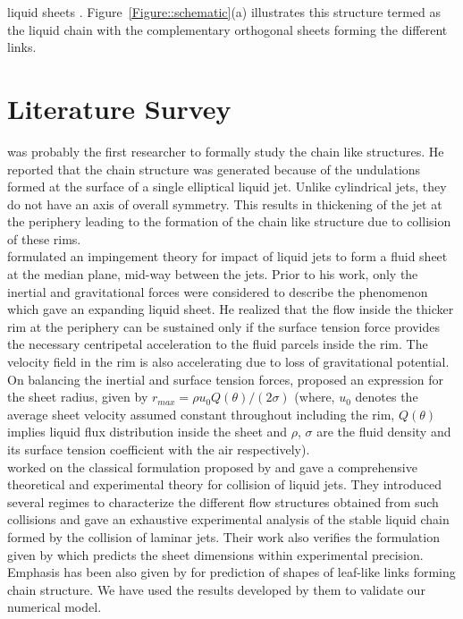 liquid sheets \citep{bush2004collision}. Figure~\ref{Figure::schematic}(a) illustrates this structure termed as the liquid chain with the complementary orthogonal sheets forming the different links. 
\section{Literature Survey}
\cite{rayleigh1879capillary,rayleigh1889tension} was probably the first researcher to formally study the chain like structures. He reported that the chain structure was generated because of the undulations formed at the surface of a single elliptical liquid jet. Unlike cylindrical jets, they do not have an axis of overall symmetry. This results in thickening of the jet at the periphery leading to the formation of the chain like structure due to collision of these rims.\\
\cite{taylor1960formation} formulated an impingement theory for impact of liquid jets to form a fluid sheet at the median plane, mid-way between the jets. Prior to his work, only the inertial and gravitational forces were considered to describe the phenomenon which gave an expanding liquid sheet. He realized that the flow inside the thicker rim at the periphery can be sustained only if the  surface tension force provides the necessary centripetal acceleration to the fluid parcels inside the rim. The velocity field in the rim is also accelerating due to loss of gravitational potential. On balancing the inertial and surface tension forces, \cite{taylor1960formation} proposed an expression for the sheet radius, given by $r_{max} = \rho u_0Q(\theta)/(2\sigma)$ (where, $u_0$ denotes the average sheet velocity assumed constant throughout including the rim, $Q(\theta)$ implies liquid flux distribution inside the sheet and $\rho$, $\sigma$ are the fluid density and its surface tension coefficient with the air respectively).\\
\cite{bush2004collision} worked on the classical formulation proposed by \cite{taylor1960formation} and gave a comprehensive theoretical and experimental theory for collision of liquid jets. They introduced several regimes to characterize the different flow structures obtained from such collisions and gave an exhaustive experimental analysis of the stable liquid chain formed by the collision of laminar jets. Their work also verifies the formulation given by \cite{taylor1960formation} which predicts the sheet dimensions within experimental precision. Emphasis has been also given by \cite{bush2004collision} for prediction of shapes of leaf-like links forming chain structure. We have used the results developed by them to validate our numerical model.\\
